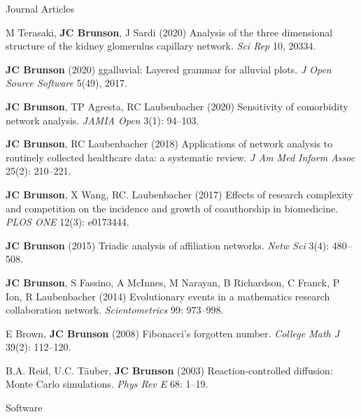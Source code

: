 \documentclass[10pt,a4paper]{article}
\begin{document}

\vspace{.25cm}
{\sc Journal Articles}
\begin{enumerate}[label={[\arabic*]},labelindent=1cm,nolistsep]
\item
M Terasaki, {\bfseries JC Brunson}, J Sardi (2020) Analysis of the three dimensional structure of the kidney glomerulus capillary network. {\itshape Sci Rep} 10, 20334.
\item
{\bfseries JC Brunson} (2020) ggalluvial: Layered grammar for alluvial plots. {\itshape J Open Source Software} 5(49), 2017.
\item
{\bfseries JC Brunson}, TP Agresta, RC Laubenbacher (2020) Sensitivity of comorbidity network analysis. {\itshape JAMIA Open} 3(1): 94--103.
\item
{\bfseries JC Brunson}, RC Laubenbacher (2018) Applications of network analysis to routinely collected healthcare data: a systematic review. {\itshape J Am Med Inform Assoc} 25(2): 210--221.
\item
{\bfseries JC Brunson}, X Wang, RC. Laubenbacher (2017) Effects of research complexity and competition on the incidence and growth of coauthorship in biomedicine. {\itshape PLOS ONE} 12(3): e0173444.
\item
{\bfseries JC Brunson} (2015) Triadic analysis of affiliation networks. {\itshape Netw Sci} 3(4): 480--508.
\item
{\bfseries JC Brunson}, S Fassino, A McInnes, M Narayan, B Richardson, C Franck, P Ion, R Laubenbacher (2014) Evolutionary events in a mathematics research collaboration network. {\itshape Scientometrics} 99: 973--998.
\item
E Brown, {\bfseries JC Brunson} (2008) Fibonacci's forgotten number. {\itshape College Math J} 39(2): 112--120.
\item
B.A. Reid, U.C. T\"{a}uber, {\bfseries JC Brunson} (2003) Reaction-controlled diffusion: Monte Carlo simulations. {\itshape Phys Rev E} 68: 1--19.
\setcounter{paper}{\value{enumi}}
\end{enumerate}
%
\vspace{.25cm}
{\sc Software}
\end{document}
